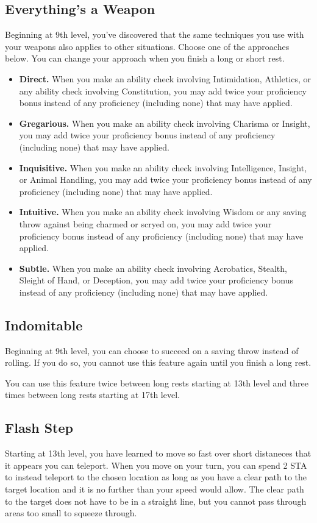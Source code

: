 \subsection{Everything's a Weapon}
Beginning at 9th level, you've discovered that the same techniques you use with your weapons also applies to other situations. Choose one of the approaches below. You can change your approach when you finish a long or short rest.

\begin{itemize}
	\item \textbf{Direct.} When you make an ability check involving Intimidation, Athletics, or any ability check involving Constitution, you may add twice your proficiency bonus instead of any proficiency (including none) that may have applied.
	\item \textbf{Gregarious.} When you make an ability check involving Charisma or Insight, you may add twice your proficiency bonus instead of any proficiency (including none) that may have applied.
	\item \textbf{Inquisitive.} When you make an ability check involving Intelligence, Insight, or Animal Handling, you may add twice your proficiency bonus instead of any proficiency (including none) that may have applied.
	\item \textbf{Intuitive.} When you make an ability check involving Wisdom or any saving throw against being charmed or scryed on, you may add twice your proficiency bonus instead of any proficiency (including none) that may have applied.
	\item \textbf{Subtle.} When you make an ability check involving Acrobatics, Stealth, Sleight of Hand, or Deception, you may add twice your proficiency bonus instead of any proficiency (including none) that may have applied.
\end{itemize}

\subsection{Indomitable}

Beginning at 9th level, you can choose to succeed on a saving throw instead of rolling. If you do so, you cannot use this feature again until you finish a long rest.

You can use this feature twice between long rests starting at 13th level and three times between long rests starting at 17th level.

\subsection{Flash Step}
Starting at 13th level, you have learned to move so fast over short distaneces that it appears you can teleport. When you move on your turn, you can spend 2 STA to instead teleport to the chosen location as long as you have a clear path to the target location and it is no further than your speed would allow. The clear path to the target does not have to be in a straight line, but you cannot pass through areas too small to squeeze through.

